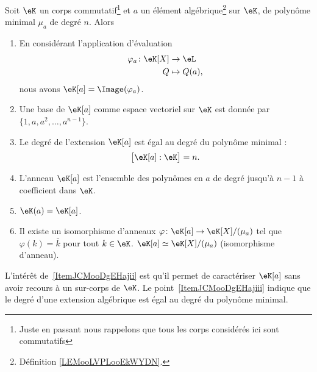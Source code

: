 \begin{proposition}   \label{PropURZooVtwNXE}
	Soit \( \eK\) un corps commutatif\footnote{Juste en passant nous rappelons que tous les corps considérés ici sont commutatifs} et \( a\) un élément algébrique\footnote{Définition \ref{LEMooLVPLooEkWYDN}.} sur \( \eK\), de polynôme minimal \( \mu_a\) de degré \( n\). Alors
	\begin{enumerate}
		\item\label{ItemJCMooDgEHajmi}
		En considérant l'application d'évaluation
		\begin{equation}
			\begin{aligned}
				\varphi_a\colon \eK[X] & \to \eL       \\
				Q                      & \mapsto Q(a),
			\end{aligned}
		\end{equation}
		nous avons \( \eK[a]=\Image(\varphi_a)\).
		\item\label{ItemJCMooDgEHajiv}
		Une base de \( \eK[a]\) comme espace vectoriel sur \( \eK\) est donnée par \( \{ 1,a,a^2,\ldots, a^{n-1} \}\).
		\item\label{ItemJCMooDgEHajiii}
		Le degré de l'extension \( \eK[a]\) est égal au degré du polynôme minimal :
		\begin{equation}
			\big[ \eK[a]:\eK \big]=n.
		\end{equation}
		\item
		      L'anneau \( \eK[a]\) est l'ensemble des polynômes en \( a\) de degré jusqu'à \( n-1\) à coefficient dans \( \eK\).
		      \item\label{ItemJCMooDgEHaji}
		      \( \eK(a)=\eK[a]\).
		\item   \label{ItemJCMooDgEHajii}
		      Il existe un isomorphisme d'anneaux \( \varphi\colon \eK[a]\to \eK[X]/(\mu_a)\) tel que \( \varphi(k)=\bar k\) pour tout \( k\in \eK\).
		      \( \eK[a]\simeq\eK[X]/(\mu_a)\) (isomorphisme d'anneau).
	\end{enumerate}
\end{proposition}
L'intérêt de~\ref{ItemJCMooDgEHajii} est qu'il permet de caractériser \( \eK[a]\) sans avoir recours à un sur-corps de \( \eK\). Le point~\ref{ItemJCMooDgEHajiii} indique que le degré d'une extension algébrique est égal au degré du polynôme minimal.


